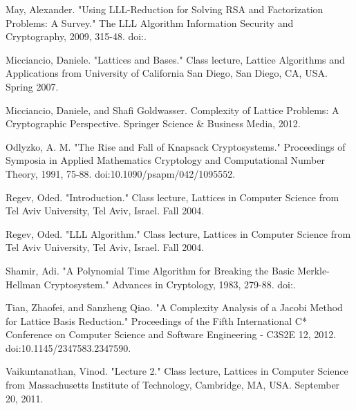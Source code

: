 \documentclass[a4paper,12pt]{article}
\begin{document}
\begin{thebibliography}{99}
 May, Alexander. "Using LLL-Reduction for Solving RSA and Factorization Problems: A Survey." The LLL Algorithm Information Security and Cryptography, 2009, 315-48. doi:.

 Micciancio, Daniele. "Lattices and Bases." Class lecture, Lattice Algorithms and Applications from University of California San Diego, San Diego, CA, USA. Spring 2007.

 Micciancio, Daniele, and Shafi Goldwasser. Complexity of Lattice Problems: A Cryptographic Perspective. Springer Science \& Business Media, 2012.

 Odlyzko, A. M. "The Rise and Fall of Knapsack Cryptosystems." Proceedings of Symposia in Applied Mathematics Cryptology and Computational Number Theory, 1991, 75-88. doi:10.1090/psapm/042/1095552.

 Regev, Oded. "Introduction." Class lecture, Lattices in Computer Science from Tel Aviv University, Tel Aviv, Israel. Fall 2004.

 Regev, Oded. "LLL Algorithm." Class lecture, Lattices in Computer Science from Tel Aviv University, Tel Aviv, Israel. Fall 2004.

 Shamir, Adi. "A Polynomial Time Algorithm for Breaking the Basic Merkle-Hellman Cryptosystem." Advances in Cryptology, 1983, 279-88. doi:.

 Tian, Zhaofei, and Sanzheng Qiao. "A Complexity Analysis of a Jacobi Method for Lattice Basis Reduction." Proceedings of the Fifth International C* Conference on Computer Science and Software Engineering - C3S2E 12, 2012. doi:10.1145/2347583.2347590.

 Vaikuntanathan, Vinod. "Lecture 2." Class lecture, Lattices in Computer Science from Massachusetts Institute of Technology, Cambridge, MA, USA. September 20, 2011. 




\end{thebibliography}
\end{document}
